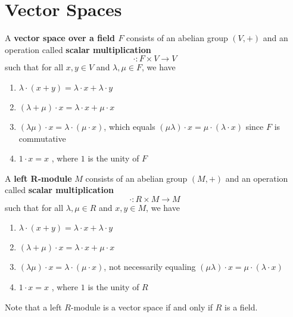 \section{Vector Spaces}

  \begin{definition}
     A \textbf{vector space over a field $F$} consists of an abelian group $(V, +)$ and an operation called \textbf{scalar multiplication} 
     \begin{equation}
       \cdot: F \times V \rightarrow V
     \end{equation}
    such that for all $x, y\in V$ and $\lambda, \mu \in F$, we have 
    \begin{enumerate}
      \item $\lambda \cdot (x + y) = \lambda \cdot x + \lambda \cdot y$
      \item $(\lambda + \mu) \cdot x = \lambda \cdot x + \mu \cdot x$ 
      \item $(\lambda \mu) \cdot x = \lambda \cdot (\mu \cdot x )$, which equals $(\mu \lambda) \cdot x = \mu \cdot (\lambda \cdot x)$ since $F$ is commutative 
      \item $1 \cdot x = x$ , where $1$ is the unity of $F$
    \end{enumerate}
  \end{definition}

  \begin{definition}
    A \textbf{left R-module} $M$ consists of an abelian group $(M, +)$ and an operation called \textbf{scalar multiplication}
    \begin{equation}
      \cdot: R \times M \longrightarrow M
    \end{equation}
    such that for all $\lambda, \mu \in R$ and $x, y \in M$, we have 
    \begin{enumerate}
      \item $\lambda \cdot (x + y) = \lambda \cdot x + \lambda \cdot y$
      \item $(\lambda + \mu) \cdot x = \lambda \cdot x + \mu \cdot x$ 
      \item $(\lambda \mu) \cdot x = \lambda \cdot (\mu \cdot x )$, not necessarily equaling $(\mu \lambda) \cdot x = \mu \cdot (\lambda \cdot x)$
      \item $1 \cdot x = x$ , where $1$ is the unity of $R$
    \end{enumerate}
    Note that a left $R$-module is a vector space if and only if $R$ is a field.
  \end{definition}

